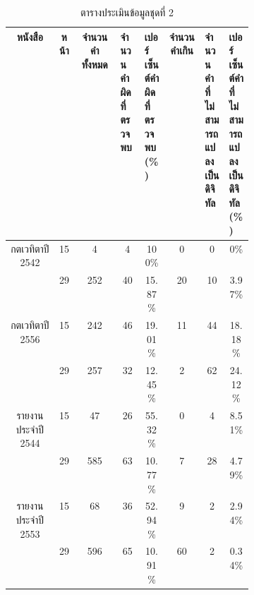 \begin{table}[H]
    \caption{ตารางประเมินข้อมูลชุดที่ 2}\label{tbl:smalldata}
    \begin{tabular}{|c|c|c|p{0.1\linewidth}|p{0.1\linewidth}|c|p{0.1\linewidth}|p{0.1\linewidth}|}
        \hline
        หนังสือ                             & หน้า  & จำนวนคำทั้งหมด & จำนวนคำผิดที่ตรวจพบ & เปอร์เซ็นต์คำผิดที่ตรวจพบ(\%)    & จำนวนคำเกิน & จำนวนคำที่ไม่สามารถแปลงเป็นดิจิทัล & เปอร์เซ็นต์คำที่ไม่สามารถแปลงเป็นดิจิทัล(\%)    \\ \hline
        \multirow{2}{*}{กตเวทิตาปี 2542}      & 15    & 4         & \multicolumn{1}{c|}{4  }         & \multicolumn{1}{c|}{100\%  } & \multicolumn{1}{c|}{0  }    & \multicolumn{1}{c|}{0   }            & \multicolumn{1}{c|}{0\%    } \\ \cline{2-8} 
                                            & 29    & 252       & \multicolumn{1}{c|}{40 }         & \multicolumn{1}{c|}{15.87\%} & \multicolumn{1}{c|}{20 }    & \multicolumn{1}{c|}{10  }            & \multicolumn{1}{c|}{3.97\% } \\ \hline
        \multirow{2}{*}{กตเวทิตาปี 2556}      & 15    & 242       & \multicolumn{1}{c|}{46 }         & \multicolumn{1}{c|}{19.01\%} & \multicolumn{1}{c|}{11 }    & \multicolumn{1}{c|}{44  }            & \multicolumn{1}{c|}{18.18\%} \\ \cline{2-8} 
                                            & 29    & 257       & \multicolumn{1}{c|}{32 }         & \multicolumn{1}{c|}{12.45\%} & \multicolumn{1}{c|}{2  }    & \multicolumn{1}{c|}{62  }            & \multicolumn{1}{c|}{24.12\%} \\ \hline
        \multirow{2}{*}{รายงานประจำปี 2544}   & 15    & 47        & \multicolumn{1}{c|}{26 }         & \multicolumn{1}{c|}{55.32\%} & \multicolumn{1}{c|}{0  }    & \multicolumn{1}{c|}{4   }            & \multicolumn{1}{c|}{8.51\% } \\ \cline{2-8} 
                                            & 29    & 585       & \multicolumn{1}{c|}{63 }         & \multicolumn{1}{c|}{10.77\%} & \multicolumn{1}{c|}{7  }    & \multicolumn{1}{c|}{28  }            & \multicolumn{1}{c|}{4.79\% } \\ \hline
        \multirow{2}{*}{รายงานประจำปี 2553}   & 15    & 68        & \multicolumn{1}{c|}{36 }         & \multicolumn{1}{c|}{52.94\%} & \multicolumn{1}{c|}{9  }    & \multicolumn{1}{c|}{2   }            & \multicolumn{1}{c|}{2.94\% } \\ \cline{2-8} 
                                            & 29    & 596       & \multicolumn{1}{c|}{65 }         & \multicolumn{1}{c|}{10.91\%} & \multicolumn{1}{c|}{60 }    & \multicolumn{1}{c|}{2   }            & \multicolumn{1}{c|}{0.34\% } \\ \hline

\end{tabular}
\end{table}
